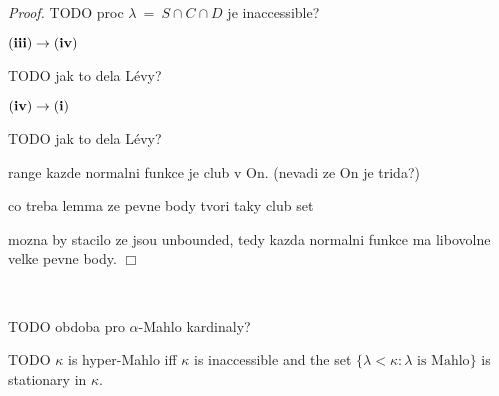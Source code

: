 \documentclass[12pt,a4paper]{article}
\newtheorem{theorem}{Theorem}[section]
\newenvironment{proof}
{\noindent \textit{Proof.}}
{\hspace*{\fill} $\Box$}
\renewcommand{\iff}{\leftrightarrow}
\newcommand{\then}{\rightarrow}
\begin{document}
\begin{}
\begin{proof}
TODO proc $\lambda\ =\ S \cap C \cap D$ je inaccessible?


$\bold{(iii) \then (iv)}$

TODO jak to dela Lévy? 

$\bold{(iv) \then (i)}$

TODO jak to dela Lévy? 

range kazde normalni funkce je club v On. (nevadi ze On je trida?)

co treba lemma ze pevne body tvori taky club set

mozna by stacilo ze jsou unbounded, tedy kazda normalni funkce ma libovolne velke pevne body.
\end{proof}

\

TODO obdoba pro $\alpha$-Mahlo kardinaly?

{\color{red}
\begin{comment}

\begin{theorem}\label{th:refl_mahlo}
$\kappa$ is Mahlo $\iff$ for any $R \subset V_\kappa$ there is an inaccessible cardinal $\alpha < \kappa$ such that $\langle V_\alpha, \in, R \cap V_\alpha \rangle \prec \langle V_\kappa, \in, R \rangle$.
\end{theorem}

\begin{proof}
Start with the proof of (\ref{th:refl_inaccessible}) and add the following:\\
$\kappa$ is Mahlo by the following contradiction. If not, there would be a~$C$ closed unbounded in $\kappa$ containing no inaccessible cardinals. By the hypothesis there is in inaccessible $\alpha < \kappa$ such that $\langle V_\alpha, \in, C \cap V_\alpha \rangle \prec \langle V_\kappa, \in, C \rangle$. By elementarity $C \cap \alpha$ is unbounded in $\alpha$. But then, $\alpha \in C$, which is the contradiction we need.
\end{proof}

\

\end{comment}
}

TODO $\kappa$ is hyper-Mahlo iff $\kappa$ is inaccessible and the set $\{\lambda < \kappa : \lambda\mbox{ is Mahlo}\}$ is stationary in $\kappa$.


\end{}
\end{document}
